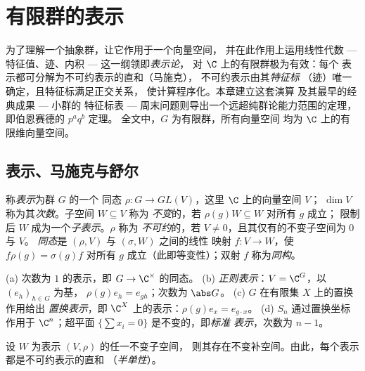\chapter{有限群的表示}\label{ch:b3:representations}

为了理解一个抽象群，让它作用于一个向量空间，
并在此作用上运用线性代数 --- 特征值、迹、内积 ---
这一纲领即\emph{表示论}，
对 $\C$ 上的有限群极为有效：每个
表示都可分解为不可约表示的直和（马施克），
不可约表示由其\emph{特征标}
（迹）唯一确定，且特征标满足正交关系，
使计算程序化。本章建立这套演算
及其最早的经典成果 --- 小群的
特征标表 --- 周末问题则导出一个远超纯群论能力范围的定理，
即伯恩赛德的 $p^aq^b$ 定理。
全文中，$G$ 为有限群，所有向量空间
均为 $\C$ 上的有限维向量空间。

\section{表示、马施克与舒尔}

\begin{definition}\label{def:b3:representations:rep}
称\emph{表示}为群 $G$ 的一个
同态 $\rho \colon G \to GL(V)$，这里 $\C$ 上的向量空间 $V$；
$\dim V$ 称为其\emph{次数}。子空间 $W \subseteq V$ 称为
\emph{不变}的，若 $\rho(g)W \subseteq W$ 对所有 $g$ 成立；
限制后 $W$ 成为一个\emph{子表示}。$\rho$ 称为
\emph{不可约}的，若 $V \neq
0$，且其仅有的不变子空间为 $0$ 与 $V$。
\emph{同态}是 $(\rho, V)$ 与 $(\sigma, W)$ 之间的线性
映射 $f\colon V \to W$，使 $f\rho(g) = \sigma(g)f$ 对所有 $g$
成立（此即等变性）；双射 $f$ 称为\emph{同构}。
\end{definition}

\begin{example}\label{ex:b3:representations:examples}
(a) 次数为 $1$ 的表示，即 $G \to \C^\times$ 的同态。
(b) \emph{正则表示}：$V = \C^G$，以 $(e_h)_{h \in G}$ 为基，
$\rho(g)e_h = e_{gh}$；次数为 $\abs G$。
(c) $G$ 在有限集 $X$ 上的置换作用给出
\emph{置换表示}，即 $\C^X$ 上的表示：$\rho(g)e_x =
e_{g\cdot x}$。
(d) $S_n$ 通过置换坐标作用于 $\C^n$；超平面
$\{\sum x_i = 0\}$ 是不变的，即\emph{标准
表示}，次数为 $n - 1$。
\end{example}

\begin{theorem}[马施克]\label{thm:b3:representations:maschke}
设 $W$ 为表示 $(V, \rho)$ 的任一不变子空间，
则其存在不变补空间。由此，每个表示
都是不可约表示的直和
（\emph{半单性}）。
\end{theorem}

